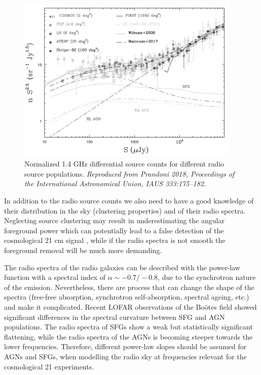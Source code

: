 \begin{figure}[!t]
   \centering
    \includegraphics[width=0.95\textwidth]{Chapman_Jelic/Images/extragal.png}
    \caption{Normalized 1.4 GHz differential source counts for different radio source populations. \textit{Reproduced from Prandoni 2018, Proceedings of the International Astronomical Union, IAUS 333:175--182}.}
    \label{fig:extragal}
\end{figure}

In addition to the radio source counts we also need to have a good knowledge of their distribution in the sky (clustering properties) and of their radio spectra. Neglecting source clustering may result in underestimating the angular foreground power which can potentially lead to a false detection of the cosmological 21 cm signal \cite{murray17,murray18}, while if the radio spectra is not smooth the foreground removal will be much more demanding.

The radio spectra of the radio galaxies can be described with the power-law function with a spectral index of  $\alpha\sim-0.7/-0.8$, due to the synchrotron nature of the emission.  Nevertheless, there are process that can change the shape of the spectra (free-free absorption, synchrotron self-absorption, spectral ageing, etc.) and make it complicated. Recent  LOFAR observations of the Bo\"otes field \cite{calistrorivera17} showed significant differences in the spectral curvature between SFG and AGN populations. The radio spectra of SFGs show a weak but statistically significant flattening, while the radio spectra of the AGNs is becoming steeper towards  the lower frequencies. Therefore, different power-law slopes should be assumed for AGNs and SFGs, when modelling the radio sky at frequencies relevant for the cosmological 21 experiments.

